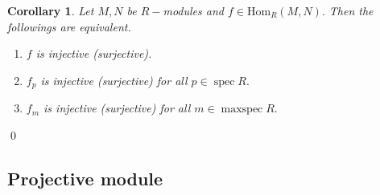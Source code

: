 \documentclass[11pt]{amsart}
\newtheorem{corollary}[theorem]{Corollary}%
\newcommand{\Hom}[1]{\text{Hom}_R\left(#1\right)}
\DeclareMathOperator{\spec}{\text{spec}}
\DeclareMathOperator{\mspec}{\text{maxspec}}
\begin{document}
\begin{corollary}

Let $M,N$ be $R-$modules and $f\in\Hom{M,N}.$ Then the followings are equivalent. 

\begin{enumerate}

\item $f$ is injective (surjective).

\item $f_p$ is injective (surjective) for all $p\in\spec R.$

\item $f_m$ is injective (surjective) for all $m\in\mspec R.$

\end{enumerate}

\end{corollary}

\proof 

\qed

\subsection{Projective module}
\end{document}
